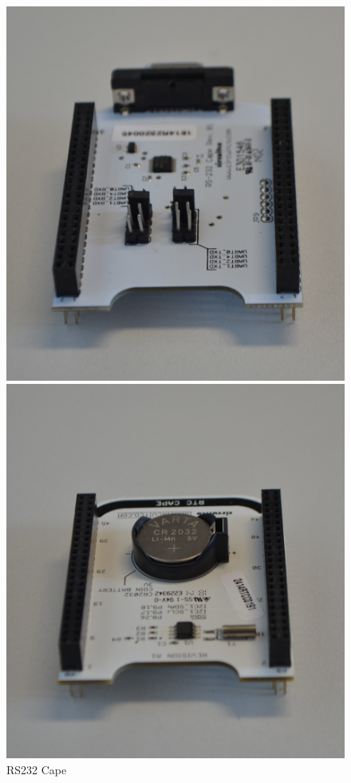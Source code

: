 \begin{figure}[!htb]
  \includegraphics[width=\linewidth]{img/general/CapeRS232.png}
  \caption{RS232 Cape}\label{figure_CapeRS232}
\endminipage\hfill
{}
  \includegraphics[width=\linewidth]{img/general/CapeRTC.png}

\end{figure}
